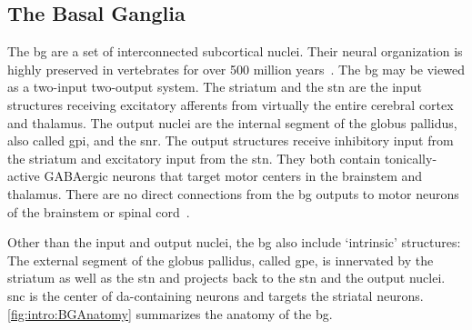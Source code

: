 \subsection{The Basal Ganglia}
\label{intro:BGAnatomy}
The \gls{bg} are a set of interconnected subcortical nuclei.
Their neural organization is highly preserved in vertebrates for over 500 million years~\cite{Grillner2016BG}.
The \gls{bg} may be viewed as a two-input two-output system.
The striatum and the \gls{stn} are the input structures receiving excitatory afferents from virtually the entire cerebral cortex and thalamus.
The output nuclei are the internal segment of the globus pallidus, also called \gls{gpi}, and the \gls{snr}.
The output structures receive inhibitory input from the striatum and excitatory input from the \gls{stn}.
They both contain tonically-active GABAergic neurons that target motor centers in the brainstem and thalamus.
There are no direct connections from the \gls{bg} outputs to motor neurons of the brainstem or spinal cord~\cite{Mink1996}.
\par
Other than the input and output nuclei, the \gls{bg} also include `intrinsic' structures:
The external segment of the globus pallidus, called \gls{gpe}, is innervated by the striatum as well as the \gls{stn} and projects back to the \gls{stn} and the output nuclei.
\Gls{snc} is the center of \gls{da}-containing neurons and targets the striatal neurons.
\autoref{fig:intro:BGAnatomy} summarizes the anatomy of the \gls{bg}.



